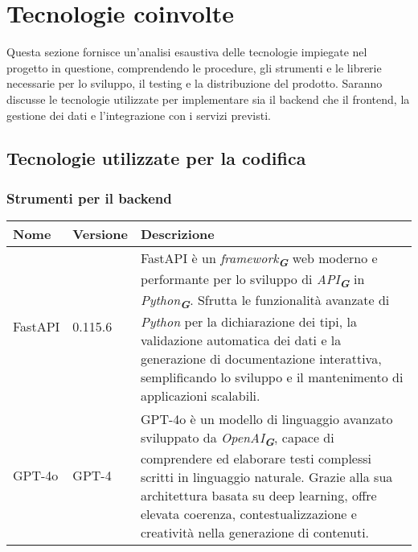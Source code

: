 

\section{Tecnologie coinvolte}
\label{sec:tecnologie_coinvolte}

Questa sezione fornisce un’analisi esaustiva delle tecnologie impiegate nel progetto in questione, comprendendo le procedure, gli
strumenti e le librerie necessarie per lo sviluppo, il testing e la distribuzione del prodotto. Saranno discusse le tecnologie
utilizzate per implementare sia il backend che il frontend, la gestione dei dati e l’integrazione con i servizi previsti.


\subsection{Tecnologie utilizzate per la codifica}

\subsubsection{Strumenti per il backend}
\label{subsec:strumenti_backend}
\begin{table}[h!]
    \centering
    \renewcommand{\arraystretch}{1.6} %
    \begin{tabularx}{\textwidth}{|p{2cm}|p{2cm}|X|} \hline
    \rowcolor[HTML]{FFD700} 
    \textbf{Nome} & \textbf{Versione} & \textbf{Descrizione} \\ \hline
    FastAPI & 0.115.6 & FastAPI è un \emph{framework}\textsubscript{\textbf{\textit{G}}} web moderno e performante per lo sviluppo di \emph{API}\textsubscript{\textbf{\textit{G}}} in \emph{Python}\textsubscript{\textbf{\textit{G}}}. 
    Sfrutta le funzionalità avanzate di \emph{Python} per la dichiarazione dei tipi, la validazione automatica dei dati e 
    la generazione di documentazione interattiva, semplificando lo sviluppo e il mantenimento di applicazioni scalabili. \\ \hline
    GPT-4o & GPT-4 & GPT-4o è un modello di linguaggio avanzato sviluppato da \emph{OpenAI}\textsubscript{\textbf{\textit{G}}}, capace di comprendere ed elaborare testi complessi scritti in linguaggio naturale. 
    Grazie alla sua architettura basata su deep learning, offre elevata coerenza, contestualizzazione e creatività nella generazione di contenuti. \\ \hline

    \end{tabularx}
\end{table}

